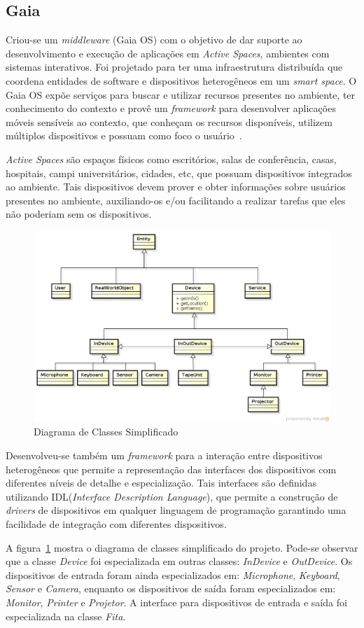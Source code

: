 \subsection{Gaia}
Criou-se um \emph{middleware} (Gaia OS) com o objetivo de dar suporte ao desenvolvimento e execução de aplicações em \emph{Active Spaces}, ambientes com sistemas interativos. Foi projetado para ter uma infraestrutura distribuída que coordena entidades de software e dispositivos heterogêneos em um \emph{smart space}. O Gaia OS expõe serviços para buscar e utilizar recursos presentes no ambiente, ter conhecimento do contexto e provê um \emph{framework} para desenvolver aplicações móveis sensíveis ao contexto, que conheçam os recursos disponíveis, utilizem múltiplos dispositivos e possuam como foco o usuário~\cite{gaia2002}.

\emph{Active Spaces} são espaços físicos como escritórios, salas de conferência, casas, hospitais, campi universitários, cidades, etc, que possuam dispositivos integrados ao ambiente. Tais dispositivos devem prover e obter informações sobre usuários presentes no ambiente, auxiliando-os e/ou facilitando a realizar tarefas que eles não poderiam sem os dispositivos.

\begin{figure}[ht]
\center
\includegraphics[scale=0.5]{imagens/gaia-devices}
\caption{Diagrama de Classes Simplificado~\cite{gaiaDevices}}
\label{fig:gaiaClassDiagram}
\end{figure}

Desenvolveu-se também um \emph{framework} para a interação entre dispositivos heterogêneos que permite a representação das interfaces dos dispositivos com diferentes níveis de detalhe e especialização. Tais interfaces são definidas utilizando IDL(\emph{Interface Description Language}), que permite a construção de \emph{drivers} de dispositivos em qualquer linguagem de programação garantindo uma facilidade de integração com diferentes dispositivos.

A figura~\ref{fig:gaiaClassDiagram} mostra o diagrama de classes simplificado do projeto. Pode-se observar que a classe \emph{Device} foi especializada em outras classes: \emph{InDevice} e \emph{OutDevice}. Os dispositivos de entrada foram ainda especializados em: \emph{Microphone}, \emph{Keyboard}, \emph{Sensor} e \emph{Camera}, enquanto os dispositivos de saída foram especializados em: \emph{Monitor}, \emph{Printer} e \emph{Projetor}. A interface para dispositivos de entrada e saída foi especializada na classe \emph{Fita}.
